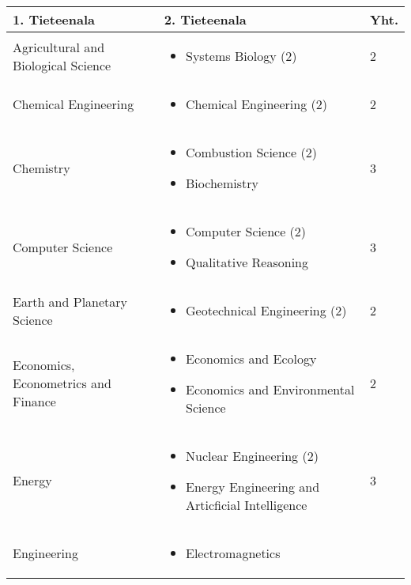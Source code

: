 \documentclass[utf8]{gradu3}
\begin{document}
\begin{longtable}[h]{|p{5cm}|p{8cm}|p{1cm}|}
    \hline
    \textbf{1. Tieteenala}    & \textbf{2. Tieteenala} & \textbf{Yht.} \\
    \hline
    Agricultural and Biological Science & \begin{itemize}
        \item Systems Biology (2)
    \end{itemize} & 2 \\
    \hline
    Chemical Engineering & \begin{itemize}
        \item Chemical Engineering (2)
    \end{itemize} & 2 \\
    \hline
    Chemistry & \begin{itemize}
        \item Combustion Science (2)
        \item Biochemistry
    \end{itemize} & 3 \\
    \hline
    Computer Science & \begin{itemize}
        \item Computer Science (2)
        \item Qualitative Reasoning
    \end{itemize} & 3 \\
    \hline
    Earth and Planetary Science & \begin{itemize}
        \item Geotechnical Engineering (2)
    \end{itemize} & 2 \\
    \hline
    Economics, Econometrics and Finance & \begin{itemize}
        \item Economics and Ecology
        \item Economics and Environmental Science
    \end{itemize} & 2 \\
    \hline
    Energy & \begin{itemize}
        \item Nuclear Engineering (2)
        \item Energy Engineering and Articficial Intelligence
    \end{itemize} & 3 \\
    \hline 
    Engineering & \begin{itemize}
        \item Electromagnetics

\end{itemize}
\end{longtable}
\end{document}
